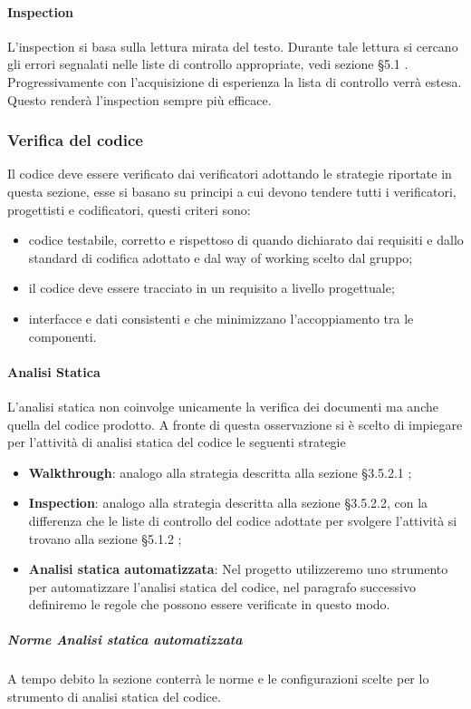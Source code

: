             \paragraph{Inspection}
                L’inspection si basa sulla lettura mirata del testo. Durante tale lettura si cercano gli errori segnalati nelle liste di controllo appropriate, vedi sezione §5.1 . Progressivamente con l’acquisizione di esperienza la lista di controllo verrà estesa. Questo renderà l’inspection sempre più efficace.

        \subsubsection{Verifica del codice}
            Il codice deve essere verificato dai verificatori adottando le strategie riportate in questa sezione, esse si basano su principi a cui devono tendere tutti i verificatori, progettisti e codificatori, questi criteri sono:
            \begin{itemize}
                \item  codice testabile, corretto e rispettoso di quando dichiarato dai requisiti e dallo standard di codifica adottato e dal way of working scelto dal gruppo;
                \item il codice deve essere tracciato in un requisito a livello progettuale; 
                \item interfacce e dati consistenti e che minimizzano l’accoppiamento tra le componenti.
            \end{itemize}
            \paragraph{Analisi Statica}
                L’analisi statica non coinvolge unicamente la verifica dei documenti ma anche quella del codice prodotto. A fronte di questa osservazione si è scelto di impiegare per l’attività di analisi statica del codice le seguenti strategie
                \begin{itemize}
                    \item\textbf{Walkthrough}: analogo alla strategia descritta alla sezione §3.5.2.1 ;
                    \item\textbf{Inspection}: analogo alla strategia descritta alla sezione §3.5.2.2, con la differenza che le liste di controllo del codice adottate per svolgere l’attività si trovano alla sezione §5.1.2 ;
                    \item\textbf{Analisi statica automatizzata}: Nel progetto utilizzeremo uno strumento per automatizzare l'analisi statica del codice, nel paragrafo successivo definiremo le regole che possono essere verificate in questo modo.
                \end{itemize}
                \subparagraph{Norme Analisi statica automatizzata}
                    A tempo debito la sezione conterrà le norme e le configurazioni scelte per lo strumento di analisi statica del codice.
